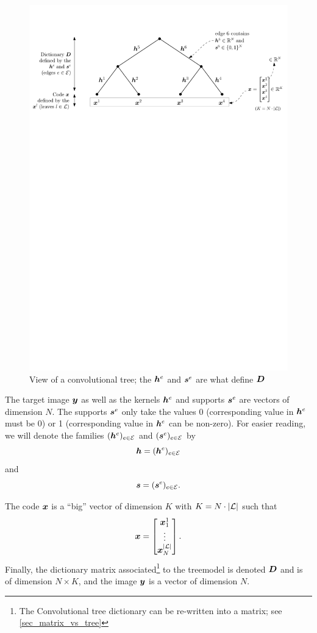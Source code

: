 \begin{figure}[!ht]\centering
\includegraphics[width=\textwidth]{figures/tree.pdf}
\caption{View of a convolutional tree; the $\bm{h}^e$ and $\bm{s}^e$ are what define $\bm{D}$}\label{fig_tree}
\end{figure}

The target image $\bm{y}$ as well as the kernels $\bm{h}^e$ and supports $\bm{s}^e$ are vectors of dimension $N$. The supports $\bm{s}^e$ only take the values 0 (corresponding value in $\bm{h}^e$ must be 0) or 1 (corresponding value in $\bm{h}^e$ can be non-zero). For easier reading, we will denote the families $(\bm{h}^e)_{e \in \mathcal E}$ and $(\bm{s}^e)_{e \in \mathcal E}$ by $$\bm{h} = (\bm{h}^e)_{e \in \mathcal E}$$ and $$\bm{s} = (\bm{s}^e)_{e \in \mathcal E}.$$

The code $\bm{x}$ is a “big” vector of dimension $K$ with $K = N \cdot |\mathcal L|$ such that $$\bm{x} = \begin{bmatrix}\bm{x}^1_1 \\ \vdots \\ \bm{x}^{|\mathcal L|}_N\end{bmatrix}.$$ 
Finally, the dictionary matrix associated\footnote{The Convolutional tree dictionary can be re-written into a matrix; see \cref{sec_matrix_vs_tree}} to the \gls{treemodel} is denoted $\bm{D}$ and is of dimension $N \times K$, and the image $\bm{y}$ is a vector of dimension $N$.

